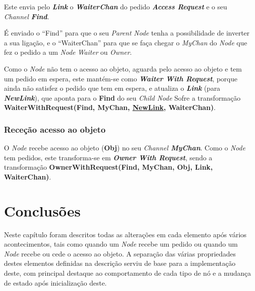 Este envia pelo \textbf{\emph{Link}} o \textbf{\emph{WaiterChan}} do pedido \emph{\textbf{Access Request}} e o seu \emph{Channel \textbf{Find}}.

É enviado o ``Find'' para que o seu \emph{Parent Node} tenha a possibilidade de inverter a sua ligação, 
e o ``WaiterChan'' para que se faça chegar o \emph{MyChan} do \emph{Node} que fez o pedido a um \emph{Node} \emph{Waiter} ou \emph{Owner}.

Como o \emph{Node} não tem o acesso ao objeto, aguarda pelo acesso ao objeto e tem um pedido em espera, este mantém-se como \emph{\textbf{Waiter With Request}},
porque ainda não satisfez o pedido que tem em espera, 
e atualiza o \textbf{\emph{Link}} (para \textbf{\emph{NewLink}}), que aponta para o \textbf{Find} do seu \emph{Child Node}
Sofre a transformação \textbf{WaiterWithRequest(Find, MyChan, \underline{NewLink}, WaiterChan)}.


\subsubsection*{Receção acesso ao objeto}
O \emph{Node} recebe acesso ao objeto (\textbf{Obj}) no seu \emph{Channel \textbf{MyChan}}.
Como o \emph{Node} tem pedidos, este transforma-se em \textbf{\emph{Owner With Request}}, sendo a transformação \textbf{OwnerWithRequest(Find, MyChan, Obj, Link, WaiterChan)}.


\section{Conclusões}
\label{especificacao:sec:conclusao}
Neste capítulo foram descritos todas as alterações em cada elemento após vários acontecimentos, tais como quando um \emph{Node} recebe um pedido ou quando um \emph{Node} recebe ou cede o acesso ao objeto.
A separação das várias propriedades destes elementos definidas na descrição serviu de base para a implementação deste, com principal destaque ao comportamento de cada tipo de nó e a mudança de estado após inicialização deste.  
